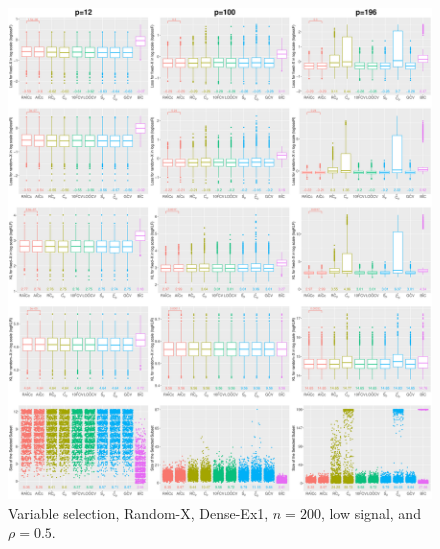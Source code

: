 \begin{figure}[!ht]
\centering
\includegraphics[width=\textwidth]{figures/supplement/randomx/subset_selection/Dense-Ex1_n200_lsnr_rho05.eps}
\caption{Variable selection, Random-X, Dense-Ex1, $n=200$, low signal, and $\rho=0.5$.}
\end{figure}
\clearpage
